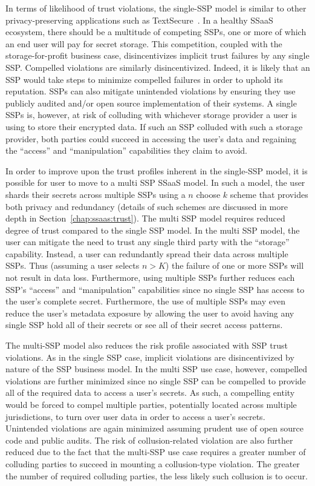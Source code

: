 In terms of likelihood of trust violations, the single-SSP model is
similar to other privacy-preserving applications such as
TextSecure~\cite{frosch2014}. In a healthy SSaaS ecosystem, there
should be a multitude of competing SSPs, one or more of which an end
user will pay for secret storage. This competition, coupled with the
storage-for-profit business case, disincentivizes implicit trust
failures by any single SSP. Compelled violations are similarly
disincentivized. Indeed, it is likely that an SSP would take steps to
minimize compelled failures in order to uphold its reputation. SSPs
can also mitigate unintended violations by ensuring they use publicly
audited and/or open source implementation of their systems. A single
SSPs is, however, at risk of colluding with whichever storage provider
a user is using to store their encrypted data. If such an SSP colluded
with such a storage provider, both parties could succeed in accessing
the user's data and regaining the ``access'' and ``manipulation''
capabilities they claim to avoid.

In order to improve upon the trust profiles inherent in the single-SSP
model, it is possible for user to move to a multi SSP SSaaS model. In
such a model, the user shards their secrets across multiple SSPs using
a $n$ choose $k$ scheme that provides both privacy and redundancy
(details of such schemes are discussed in more depth in
Section~\ref{chap:ssaas:trust}). The multi SSP model requires reduced
degree of trust compared to the single SSP model. In the multi SSP
model, the user can mitigate the need to trust any single third party
with the ``storage'' capability. Instead, a user can redundantly
spread their data across multiple SSPs. Thus (assuming a user selects
$n > K$) the failure of one or more SSPs will not result in data
loss. Furthermore, using multiple SSPs further reduces each SSP's
``access'' and ``manipulation'' capabilities since no single SSP has
access to the user's complete secret. Furthermore, the use of multiple
SSPs may even reduce the user's metadata exposure by allowing the user
to avoid having any single SSP hold all of their secrets or see all of
their secret access patterns.

The multi-SSP model also reduces the risk profile associated with SSP
trust violations. As in the single SSP case, implicit violations are
disincentivized by nature of the SSP business model. In the multi SSP
use case, however, compelled violations are further minimized since no
single SSP can be compelled to provide all of the required data to
access a user's secrets. As such, a compelling entity would be forced
to compel multiple parties, potentially located across multiple
jurisdictions, to turn over user data in order to access a user's
secrets. Unintended violations are again minimized assuming prudent
use of open source code and public audits. The risk of
collusion-related violation are also further reduced due to the fact
that the multi-SSP use case requires a greater number of colluding
parties to succeed in mounting a collusion-type violation. The greater
the number of required colluding parties, the less likely such
collusion is to occur.


